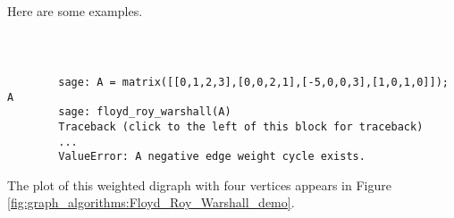 Here are some examples.

%
%
%
%

%
%
%
%

%
\begin{center}
\fontsize{9pt}{9pt}
\selectfont
\tt
\begin{lstlisting}

        sage: A = matrix([[0,1,2,3],[0,0,2,1],[-5,0,0,3],[1,0,1,0]]); A
        sage: floyd_roy_warshall(A)
        Traceback (click to the left of this block for traceback)
        ...
        ValueError: A negative edge weight cycle exists.

\end{lstlisting}
\end{center}
%

The plot of this weighted digraph with four vertices appears in 
Figure \ref{fig:graph_algorithms:Floyd_Roy_Warshall_demo}.



